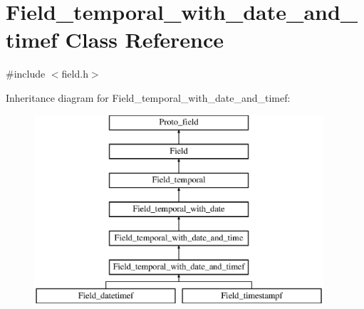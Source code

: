 \hypertarget{classField__temporal__with__date__and__timef}{}\section{Field\+\_\+temporal\+\_\+with\+\_\+date\+\_\+and\+\_\+timef Class Reference}
\label{classField__temporal__with__date__and__timef}


{\ttfamily \#include $<$field.\+h$>$}

Inheritance diagram for Field\+\_\+temporal\+\_\+with\+\_\+date\+\_\+and\+\_\+timef\+:\begin{figure}[H]
\begin{center}
\leavevmode
\includegraphics[height=7.000000cm]{classField__temporal__with__date__and__timef}
\end{center}
\end{figure}
